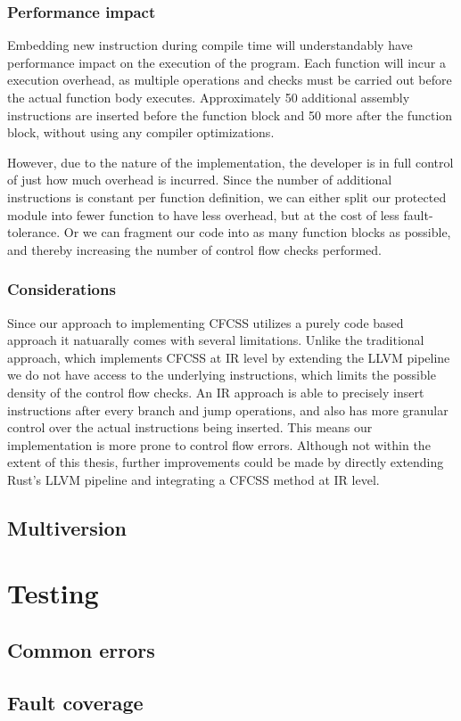 \documentclass[12pt, letterpaper]{article}
\begin{document}
\subsubsection{Performance impact}

Embedding new instruction during compile time will understandably have performance impact on the execution of the program. Each function will incur a execution overhead, as multiple operations and checks must be carried out before the actual function body executes. Approximately 50 additional assembly instructions are inserted before the function block and 50 more after the function block, without using any compiler optimizations.

However, due to the nature of the implementation, the developer is in full control of just how much overhead is incurred. Since the number of additional instructions is constant per function definition, we can either split our protected module into fewer function to have less overhead, but at the cost of less fault-tolerance. Or we can fragment our code into as many function blocks as possible, and thereby increasing the number of control flow checks performed.

\subsubsection{Considerations}

Since our approach to implementing CFCSS utilizes a purely code based approach it natuarally comes with several limitations. Unlike the traditional approach, which implements CFCSS at IR level by extending the LLVM pipeline we do not have access to the underlying instructions, which limits the possible density of the control flow checks. An IR approach is able to precisely insert instructions after every branch and jump operations, and also has more granular control over the actual instructions being inserted. This means our implementation is more prone to control flow errors. Although not within the extent of this thesis, further improvements could be made by directly extending Rust's LLVM pipeline and integrating a CFCSS method at IR level.

\newpage
\subsection{Multiversion}

\section{Testing}

\subsection{Common errors}

\subsection{Fault coverage}

\newpage
\printbibliography
\end{document}
